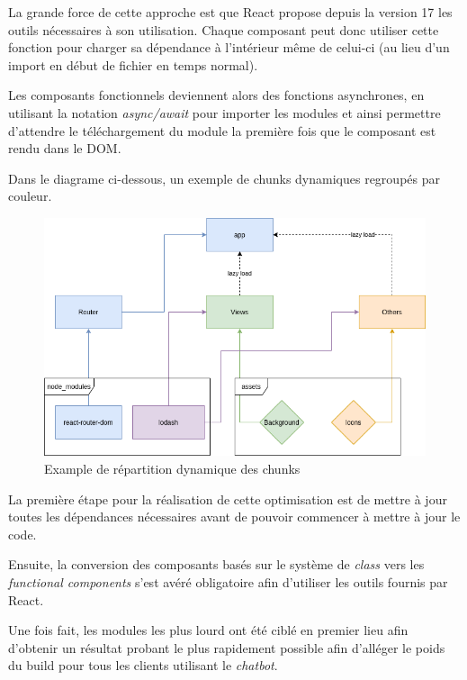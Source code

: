 \documentclass[12pt,a4paper,oneside]{scrreprt}
\begin{document}
La grande force de cette approche est que React propose depuis la version 17 les outils nécessaires à son utilisation. Chaque composant peut donc utiliser cette fonction pour charger sa dépendance à l'intérieur même de celui-ci (au lieu d'un import en début de fichier en temps normal).

Les composants fonctionnels deviennent alors des fonctions asynchrones, en utilisant la notation \textit{async/await} pour importer les modules et ainsi permettre d'attendre le téléchargement du module la première fois que le composant est rendu dans le DOM.

Dans le diagrame ci-dessous, un exemple de chunks dynamiques regroupés par couleur.

\begin{figure}[!ht]
	\centering
	\includegraphics[width=\textwidth]{pictures/dynamics_imports.png}
	\caption{Example de répartition dynamique des chunks}
\end{figure}

\begin{info}
	La première étape pour la réalisation de cette optimisation est de mettre à jour toutes les dépendances nécessaires avant de pouvoir commencer à mettre à jour le code.

	Ensuite, la conversion des composants basés sur le système de \textit{class} vers les \textit{functional components} s'est avéré obligatoire afin d'utiliser les outils fournis par React.

	Une fois fait, les modules les plus lourd ont été ciblé en premier lieu afin d'obtenir un résultat probant le plus rapidement possible afin d'alléger le poids du build pour tous les clients utilisant le \textit{chatbot}.
\end{info}
\end{document}

